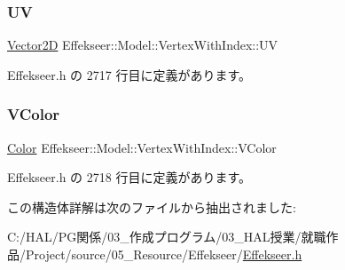 \subsubsection{\texorpdfstring{UV}{UV}}
{\footnotesize\ttfamily \mbox{\hyperlink{struct_effekseer_1_1_vector2_d}{Vector2D}} Effekseer\+::\+Model\+::\+Vertex\+With\+Index\+::\+UV}



 Effekseer.\+h の 2717 行目に定義があります。

\mbox{\label{struct_effekseer_1_1_model_1_1_vertex_with_index_aff987e0ba3b15c7682072f054860d2bc}} 
\subsubsection{\texorpdfstring{V\+Color}{VColor}}
{\footnotesize\ttfamily \mbox{\hyperlink{struct_effekseer_1_1_color}{Color}} Effekseer\+::\+Model\+::\+Vertex\+With\+Index\+::\+V\+Color}



 Effekseer.\+h の 2718 行目に定義があります。



この構造体詳解は次のファイルから抽出されました\+:\begin{DoxyCompactItemize}
\item 
C\+:/\+H\+A\+L/\+P\+G関係/03\+\_\+作成プログラム/03\+\_\+\+H\+A\+L授業/就職作品/\+Project/source/05\+\_\+\+Resource/\+Effekseer/\mbox{\hyperlink{_effekseer_8h}{Effekseer.\+h}}\end{DoxyCompactItemize}
